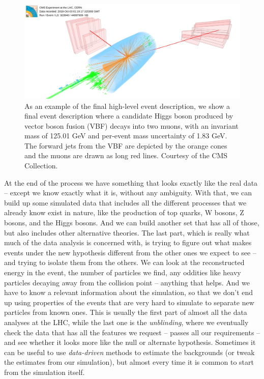 \begin{figure}
    \centering
     \includegraphics[width=\columnwidth]{gfx/ch2/HIG-19-006_VBF_white.png}
    \caption[CMS Event]{As an example of the final high-level event description, we show a final event description  where a candidate Higgs boson produced by vector boson fusion (VBF) decays into two muons, with an invariant mass of 125.01 GeV and per-event mass uncertainty of 1.83 GeV. The forward jets from the VBF are depicted by the orange cones and the muons are drawn as long red lines. Courtesy of the CMS Collection.}
    \label{fig:cmsev}
\end{figure}


At the end of the process we have something that looks exactly like the real data – except we know exactly what it is, without any ambiguity. With that, we can build up some simulated data that includes all the different processes that we already know exist in nature, like the production of top quarks, W bosons, Z bosons, and the Higgs bosons. And we can build another set that has all of those, but also includes other alternative theories. The last part, which is really what much of the data analysis is concerned with, is trying to figure out what makes events under the new hypothesis different from the other ones we expect to see – and trying to isolate them from the others. We can look at the reconstructed energy in the event, the number of particles we find, any oddities like heavy particles decaying away from the collision point – anything that helps. And we have to know a relevant information about the simulation, so that we don’t end up using properties of the events that are very hard to simulate to separate new particles from known ones. This is usually the first part of almost all the data analyses at the LHC, while the last one is the \emph{unblinding}, where we eventually check the data that has all the features we request – passes all our requirements – and see whether it looks more like the null or alternate hypothesis. Sometimes it can be useful to use \emph{data-driven} methods to estimate the backgrounds (or tweak the estimates from our simulation), but almost every time it is common to start from the simulation itself.


